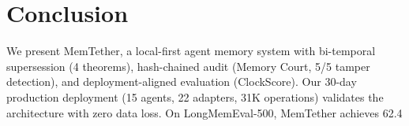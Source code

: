 \documentclass[sigconf,nonacm]{acmart}
\begin{document}
\section{Conclusion}
We present MemTether, a local-first agent memory system with bi-temporal supersession (4 theorems), hash-chained audit (Memory Court, 5/5 tamper detection), and deployment-aligned evaluation (ClockScore). Our 30-day production deployment (15 agents, 22 adapters, 31K operations) validates the architecture with zero data loss. On LongMemEval-500, MemTether achieves 62.4%
\end{document}
